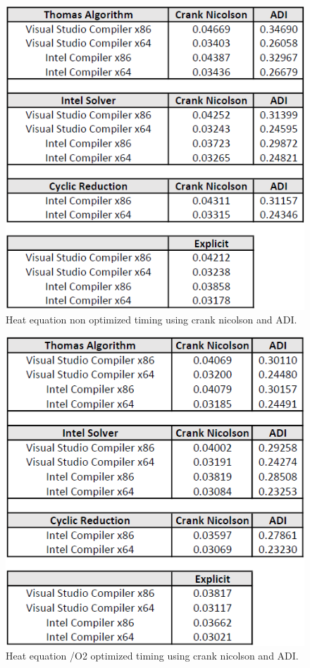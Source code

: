 \documentclass[12pt, oneside]{book}
\theoremstyle{plain}
\theoremstyle{definition}
\begin{document}
\begin{figure}[!htb]
    \centering
        \includegraphics[scale=0.6]{heatNotOptimized.png}
    \caption{Heat equation non optimized timing using crank nicolson and ADI.}
\end{figure}

\begin{figure}[!htb]
    \centering
        \includegraphics[scale=0.6]{heat2Optimized.png}
    \caption{Heat equation /O2 optimized timing using crank nicolson and ADI.}
\end{figure}
\end{document}
